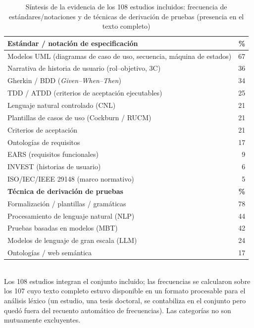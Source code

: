 \documentclass[10pt,journal,twoside,letterpaper]{IEEEtran}
\begin{document}
	\begin{table}[!t]
		\caption{Síntesis de la evidencia de los 108 estudios incluidos: frecuencia de estándares/notaciones y de técnicas de derivación de pruebas (presencia en el texto completo)}
		\label{tab:sintesis}
		\centering
		\small
		\setlength{\tabcolsep}{6pt}
		\begin{tabular}{@{}p{6.9cm}r@{}}
			\toprule
			\textbf{Estándar / notación de especificación} & \textbf{\%} \\
			\midrule
			Modelos UML (diagramas de caso de uso, secuencia, máquina de estados) & 67 \\
			Narrativa de historia de usuario (rol--objetivo, 3C) & 36 \\
			Gherkin / BDD (\emph{Given--When--Then}) & 34 \\
			TDD / ATDD (criterios de aceptación ejecutables) & 25 \\
			Lenguaje natural controlado (CNL) & 21 \\
			Plantillas de casos de uso (Cockburn / RUCM) & 21 \\
			Criterios de aceptación & 21 \\
			Ontologías de requisitos & 17 \\
			EARS (requisitos funcionales) & 9 \\
			INVEST (historias de usuario) & 6 \\
			ISO/IEC/IEEE 29148 (marco normativo) & 5 \\
			\midrule
			\textbf{Técnica de derivación de pruebas} & \textbf{\%} \\
			\midrule
			Formalización / plantillas / gramáticas & 78 \\
			Procesamiento de lenguaje natural (NLP) & 44 \\
			Pruebas basadas en modelos (MBT) & 42 \\
			Modelos de lenguaje de gran escala (LLM) & 24 \\
			Ontologías / web semántica & 17 \\
			\bottomrule
		\end{tabular}
		\\[3pt]
		{\footnotesize Los 108 estudios integran el conjunto incluido; las frecuencias se calcularon sobre los 107 cuyo texto completo estuvo disponible en un formato procesable para el análisis léxico (un estudio, una tesis doctoral, se contabiliza en el conjunto pero quedó fuera del recuento automático de frecuencias). Las categorías no son mutuamente excluyentes.}
	\end{table}
	
\end{document}
